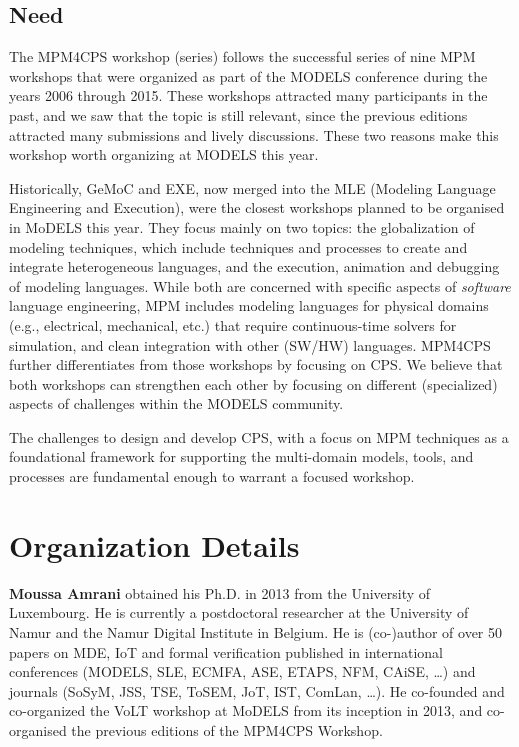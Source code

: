\subsection{Need}
The MPM4CPS workshop (series) follows the successful series of nine MPM workshops that 
were organized as part of the MODELS conference during the years 2006 through 2015.
These workshops attracted many participants in the past, and we saw that the topic
is still relevant, since the previous editions attracted many submissions and lively discussions.
These two reasons make this workshop worth organizing at MODELS this year.

Historically, GeMoC and EXE, now merged into the MLE (Modeling Language 
Engineering and Execution), were the closest workshops planned to be organised 
in MoDELS this year. They focus mainly on two topics: the globalization of
modeling techniques, which include techniques and processes to create and
integrate heterogeneous languages, and the execution, animation and debugging
of modeling languages. While both are concerned with specific aspects of 
\emph{software} language engineering, MPM includes modeling languages for 
physical domains (e.g., electrical, mechanical, etc.) that require 
continuous-time solvers for simulation, and clean integration with other (SW/HW) 
languages.
MPM4CPS further differentiates from those workshops by focusing on CPS. 
We believe that both workshops can strengthen each other by focusing on different 
(specialized) aspects of challenges within the MODELS community.


The challenges to design and develop CPS, with a focus on MPM techniques as a 
foundational framework for supporting the multi-domain models, tools, and 
processes are fundamental enough to warrant a focused workshop.

\section{Organization Details}
\noindent
\textbf{Moussa Amrani} obtained his Ph.D. in 2013 from the University of Luxembourg. 
He is currently a postdoctoral researcher at the University of Namur and the Namur Digital Institute in Belgium. 
He is (co-)author of over 50 papers on MDE, IoT and formal verification published in international conferences (MODELS, SLE, ECMFA, ASE, ETAPS, NFM, CAiSE, \ldots) and journals (SoSyM, JSS, TSE, ToSEM, JoT, IST, ComLan, \ldots). He co-founded and co-organized the VoLT workshop at MoDELS from its inception in 2013, and co-organised
the previous editions of the MPM4CPS Workshop.

